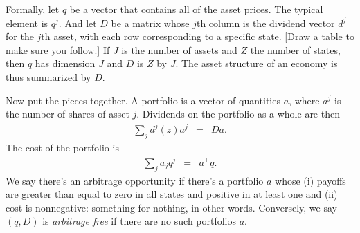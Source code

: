\documentclass[11pt]{article}
\begin{document}
Formally, let $q$ be a vector that contains all of the asset prices.
The typical element is $q^j$.
And let $D$ be a matrix whose $j$th column is the dividend
vector $d^j$ for the $j$th asset,
with each row corresponding to a specific state.
[Draw a table to make sure you follow.]
If $J$ is the number of assets and $Z$ the number of states,
then $q$ has dimension $J$ and $D$ is $Z$ by $J$.
The asset structure of an economy is thus summarized by $D$.

Now put the pieces together.
A portfolio is a vector of quantities $a$,
where $a^j$ is the number of shares of asset $j$.
Dividends on the portfolio as a whole are then
\begin{eqnarray*}
    \sum_j d^j(z) a^j &=& D a .
\end{eqnarray*}
The cost of the portfolio is
\begin{eqnarray*}
    \sum_j a_j q^j &=& a^\top q .
\end{eqnarray*}
We say there's an arbitrage opportunity if there's a portfolio $a$
whose (i) payoffs are greater than equal to zero in all states and positive in at least one
and (ii) cost is nonnegative:  something for nothing, in other words.
Conversely, we say $(q,D)$ is {\it arbitrage free\/} if there are no such portfolios $a$.
\end{document}
